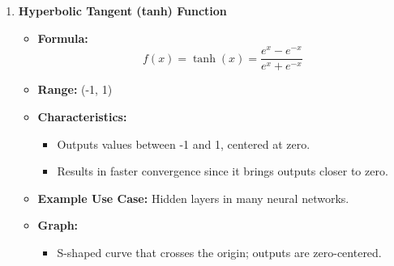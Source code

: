 \documentclass[aspectratio=169]{beamer}
\begin{document}
\begin{frame}[fragile]
\begin{enumerate}
        \item \textbf{Hyperbolic Tangent (tanh) Function}
            \begin{itemize}
                \item \textbf{Formula:}
                    \begin{equation*}
                    f(x) = \tanh(x) = \frac{e^{x} - e^{-x}}{e^{x} + e^{-x}}
                    \end{equation*}
                \item \textbf{Range:} (-1, 1)
                \item \textbf{Characteristics:}
                    \begin{itemize}
                        \item Outputs values between -1 and 1, centered at zero.
                        \item Results in faster convergence since it brings outputs closer to zero.
                    \end{itemize}
                \item \textbf{Example Use Case:} Hidden layers in many neural networks.
                \item \textbf{Graph:}
                    \begin{itemize}
                        \item S-shaped curve that crosses the origin; outputs are zero-centered.
                    \end{itemize}
            \end{itemize}
    \end{enumerate}
\end{frame}
\end{document}
